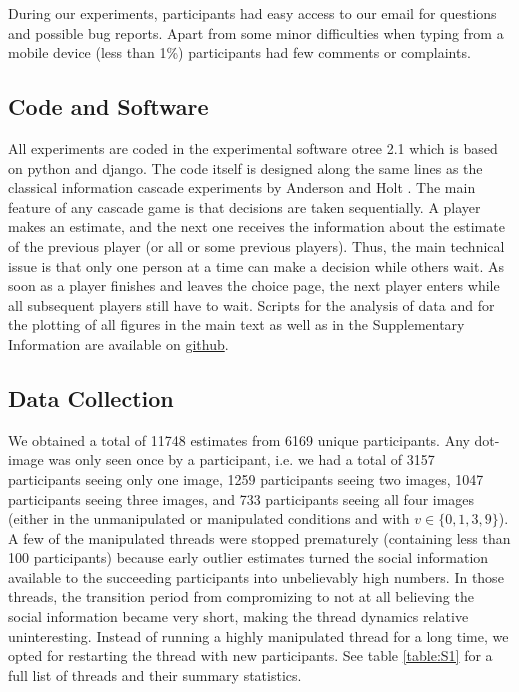 \documentclass[9pt,twoside,lineno]{pnas-new}
\begin{document}
During our experiments, participants had easy access to our email for questions and possible bug reports. Apart from some minor difficulties when typing from a mobile device (less than 1\%) participants had few comments or complaints.

\subsection*{Code and Software}
All experiments are coded in the experimental software otree 2.1 \cite{chen2016otree} which is based on python and django. The code itself is designed along the same lines as the classical information cascade experiments by Anderson and Holt \cite{anderson1997information}. The main feature of any cascade game is that decisions are taken sequentially. A player makes an estimate, and the next one receives the information about the estimate of the previous player (or all or some previous players). Thus, the main technical issue is that only one person at a time can make a decision while others wait. As soon as a player finishes and leaves the choice page, the next player enters while all subsequent players still have to wait. Scripts for the analysis of data and for the plotting of all figures in the main text as well as in the Supplementary Information are available on \href{https://github.com/gavstrik/WoT}{github}.

\subsection*{Data Collection}
We obtained a total of 11748 estimates from 6169 unique participants. Any dot-image was only seen once by a participant, i.e. we had a total of 3157 participants seeing only one image, 1259 participants seeing two images, 1047 participants seeing three images, and 733 participants seeing all four images (either in the unmanipulated or manipulated conditions and with $v\in\{0,1,3,9\}$). A few of the manipulated threads were stopped prematurely (containing less than 100 participants) because early outlier estimates turned the social information available to the succeeding participants into unbelievably high numbers. In those threads, the transition period from compromizing to not at all believing the social information became very short, making the thread dynamics relative uninteresting. Instead of running a highly manipulated thread for a long time, we opted for restarting the thread with new participants. See table \ref{table:S1} for a full list of threads and their summary statistics. 
\end{document}
